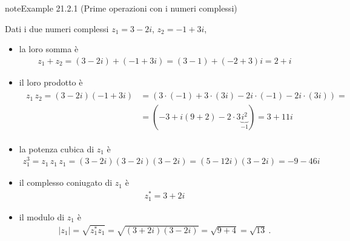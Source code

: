 \documentclass[letterpaper,10pt,italian]{jupyterBook}
\begin{document}
\begin{sphinxadmonition}{note}{Example 21.2.1 (Prime operazioni con i numeri complessi)}



\sphinxAtStartPar
Dati i due numeri complessi \(z_1 = 3 - 2 i\), \(z_2 = -1 + 3 i\),
\begin{itemize}
\item {} 
\sphinxAtStartPar
la loro somma è
\begin{equation*}
\begin{split}z_1 + z_2 = (3 - 2i) + (-1 + 3 i) = (3-1) +(-2+3)i = 2 + i\end{split}
\end{equation*}
\item {} 
\sphinxAtStartPar
il loro prodotto è
\begin{equation*}
\begin{split}\begin{aligned}
    z_1 \, z_2 = (3-2i)(-1+3i) & = ( 3 \cdot (-1) + 3 \cdot (3i) - 2i \cdot (-1) - 2i \cdot (3i) ) = \\
    & = (-3 + i ( 9 + 2 ) - 2 \cdot 3 \underbrace{i^2}_{-1} ) = 3 + 11 i
   \end{aligned}\end{split}
\end{equation*}
\item {} 
\sphinxAtStartPar
la potenza cubica di \(z_1\) è
\begin{equation*}
\begin{split}z_1^3 = z_1 \, z_1 \, z_1 = (3-2i)(3-2i)(3-2i) = (5-12 i)(3-2i) = -9 - 46 i\end{split}
\end{equation*}
\item {} 
\sphinxAtStartPar
il complesso coniugato di \(z_1\) è
\begin{equation*}
\begin{split}z_1^* = 3 + 2 i\end{split}
\end{equation*}
\item {} 
\sphinxAtStartPar
il modulo di \(z_1\) è
\begin{equation*}
\begin{split}|z_1| = \sqrt{z_1^* z_1} = \sqrt{(3+2 i)(3-2i)} = \sqrt{9+4} = \sqrt{13} \ .\end{split}
\end{equation*}
\end{itemize}
\end{sphinxadmonition}
\end{document}
